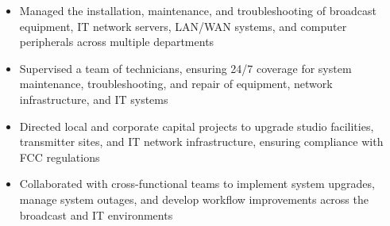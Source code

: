 \par\bigskip
{}
\par\smallskip
\begin{minipage}{13.75cm}
  \begin{minipage}{6.5cm}
    \begin{itemize}
      \item Managed the installation, maintenance, and troubleshooting of broadcast equipment, IT network servers, LAN/WAN systems, and computer peripherals across multiple departments
      \item Supervised a team of technicians, ensuring 24/7 coverage for system maintenance, troubleshooting, and repair of equipment, network infrastructure, and IT systems
    \end{itemize}
  \end{minipage}
  \hfill
  \begin{minipage}{6.5cm}
    \begin{itemize}
      \item Directed local and corporate capital projects to upgrade studio facilities, transmitter sites, and IT network infrastructure, ensuring compliance with FCC regulations
      \item Collaborated with cross-functional teams to implement system upgrades, manage system outages, and develop workflow improvements across the broadcast and IT environments
    \end{itemize}
  \end{minipage}
\end{minipage}
\par\smallskip
\divider

